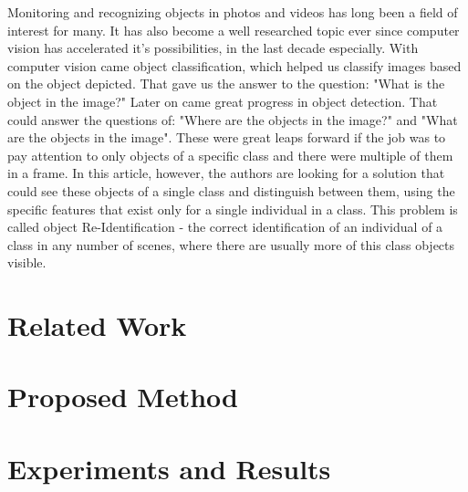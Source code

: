 \documentclass[conference]{IEEEtran} %
\begin{document}
Monitoring and recognizing objects in photos and videos has long been a field of interest for many. It has also become a well researched topic ever since computer vision has accelerated it's possibilities, in the last decade especially.
 With computer vision came object classification, which helped us classify images based on the object depicted. That gave us the answer to the question: "What is the object in the image?"
  Later on came great progress in object detection. That could answer the questions of: "Where are the objects in the image?" and "What are the objects in the image". These were great leaps forward if the job was to pay attention to only objects of a specific class and there were multiple of them in a frame.
 In this article, however, the authors are looking for a solution that could see these objects of a single class and distinguish between them, using the specific features that exist only for a single individual in a class.
 This problem is called object Re-Identification - the correct identification of an individual of a class in any number of scenes, where there are usually more of this class objects visible.
	
	\section{Related Work}
	
	\section{Proposed Method}
	
	\section{Experiments and Results}
	
\end{document}
